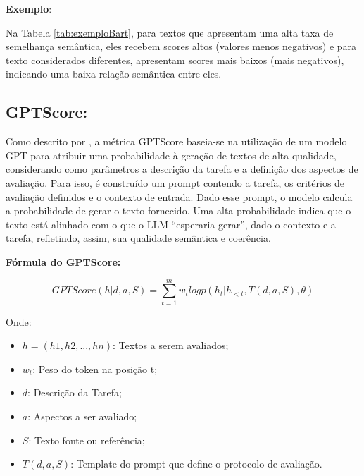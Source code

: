 \textbf{Exemplo}:

\begin{table}[H]
\caption{Exemplo do cálculo do BartScore}
\label{tab:exemploBart}
\end{table}

Na Tabela \ref{tab:exemploBart}, para textos que apresentam uma alta taxa de semelhança semântica, eles recebem scores altos (valores menos negativos) e para texto considerados diferentes, apresentam scores mais baixos (mais negativos), indicando uma baixa relação semântica entre eles. 



\subsection{GPTScore:}
Como descrito por \cite{fu2023gptscoreevaluatedesire}, a métrica GPTScore baseia-se na utilização de um modelo GPT para atribuir uma probabilidade à geração de textos de alta qualidade, considerando como parâmetros a descrição da tarefa e a definição dos aspectos de avaliação. Para isso, é construído um prompt contendo a tarefa, os critérios de avaliação definidos e o contexto de entrada. Dado esse prompt, o modelo calcula a probabilidade de gerar o texto fornecido. Uma alta probabilidade indica que o texto está alinhado com o que o LLM “esperaria gerar”, dado o contexto e a tarefa, refletindo, assim, sua qualidade semântica e coerência.


\textbf{Fórmula do GPTScore:}

\begin{equation}
    GPTScore(h | d, a, S) = \sum_{t=1}^{m}w_t log p(h_t|h_{<t}, T(d,a,S), \theta)
\end{equation}

Onde:
\begin{itemize}
    \item \(h = (h1, h2, ..., hn)\): Textos a serem avaliados;
    \item \(w_t\): Peso do token na posição t;
    \item \(d\): Descrição da Tarefa; 
    \item \(a\): Aspectos a ser avaliado;
    \item \(S\): Texto fonte ou referência;
    \item \(T(d,a,S)\): Template do prompt que define o protocolo de avaliação. 
\end{itemize}


